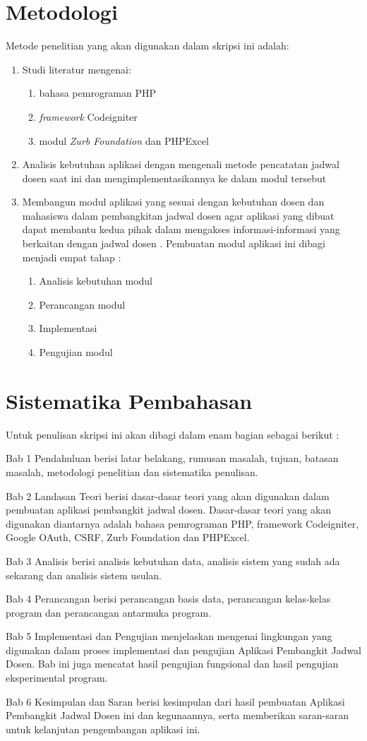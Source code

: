\section{Metodologi}
\label{sec:metlit}
Metode penelitian yang akan digunakan dalam skripsi ini adalah:
\begin{enumerate}
   \item Studi literatur mengenai:
   		\begin{enumerate}
 		\item bahasa pemrograman PHP
 		\item \textit{framework} Codeigniter
 		\item modul \textit{Zurb Foundation} dan PHPExcel
		\end{enumerate}
   \item Analisis kebutuhan aplikasi dengan mengenali metode pencatatan jadwal dosen saat ini dan mengimplementasikannya ke dalam modul tersebut
    \item Membangun modul aplikasi yang sesuai dengan kebutuhan dosen dan mahasiswa dalam pembangkitan jadwal dosen agar aplikasi yang dibuat dapat membantu kedua pihak dalam mengakses informasi-informasi yang berkaitan dengan jadwal dosen . Pembuatan modul aplikasi ini dibagi menjadi empat tahap :
    	\begin{enumerate}
 		\item Analisis kebutuhan modul 
 		\item Perancangan modul
 		\item Implementasi 
 		\item Pengujian modul
		\end{enumerate}
\end{enumerate}
 

\section{Sistematika Pembahasan}
\label{sec:sispem}
Untuk penulisan skripsi ini akan dibagi dalam enam bagian sebagai berikut :

Bab 1 Pendahuluan berisi latar belakang, rumusan masalah, tujuan, batasan masalah,  metodologi penelitian dan sistematika penulisan.

Bab 2 Landasan Teori berisi dasar-dasar teori yang akan digunakan dalam pembuatan aplikasi pembangkit jadwal dosen. Dasar-dasar teori yang akan digunakan diantarnya adalah bahasa pemrograman PHP, framework Codeigniter, Google OAuth, CSRF, Zurb Foundation dan PHPExcel.

Bab 3 Analisis berisi analisis kebutuhan data, analisis sistem yang sudah ada sekarang dan analisis sistem usulan.

Bab 4 Perancangan berisi perancangan basis data, perancangan kelas-kelas program dan perancangan antarmuka program.

Bab 5 Implementasi dan Pengujian menjelaskan mengenai lingkungan yang digunakan dalam proses implementasi dan pengujian Aplikasi Pembangkit Jadwal Dosen. Bab ini juga mencatat hasil pengujian fungsional dan hasil pengujian eksperimental program.

Bab 6 Kesimpulan dan Saran berisi kesimpulan dari hasil pembuatan Aplikasi Pembangkit Jadwal Dosen ini dan kegunaannya, serta memberikan saran-saran untuk kelanjutan pengembangan aplikasi ini.
